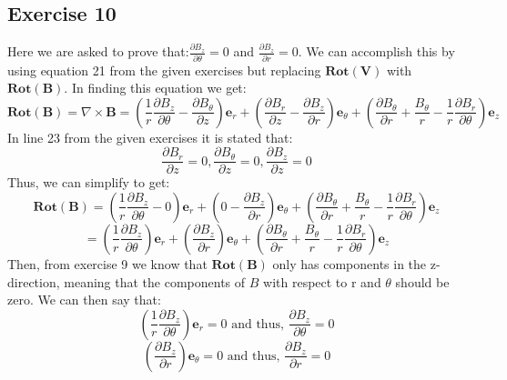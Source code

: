 \documentclass{article}
\begin{document}
\subsection{Exercise 10}
Here we are asked to prove that:$\frac{\partial B_{z}}{\partial \theta}=0$ and $\frac{\partial B_{z}}{\partial r}=0$. We can accomplish this by using equation 21 from the given exercises but replacing $\mathbf{Rot(V)}$ with $\mathbf{Rot(B)}$. In finding this equation we get:
\begin{equation}
    \mathbf{Rot(B)}=\nabla \times \mathbf{B}=\left(\frac{1}{r}\frac{\partial B_{z}}{\partial \theta}-\frac{\partial B_{\theta}}{\partial z}\right)\mathbf{e}_{r}+\left(\frac{\partial B_{r}}{\partial z}-\frac{\partial B_{z}}{\partial r}\right)\mathbf{e}_{\theta}+\left(\frac{\partial B_{\theta}}{\partial r}+\frac{B_{\theta}}{r}-\frac{1}{r}\frac{\partial B_{r}}{\partial \theta}\right)\mathbf{e}_{z}
\end{equation}
In line 23 from the given exercises it is stated that:
\begin{equation}
    \frac{\partial B_{r}}{\partial z}=0,\frac{\partial B_{\theta}}{\partial z}=0,\frac{\partial B_{z}}{\partial z}=0
\end{equation}
Thus, we can simplify to get:
\begin{equation}
    \mathbf{Rot(B)}=\left(\frac{1}{r}\frac{\partial B_{z}}{\partial \theta}-0\right)\mathbf{e}_{r}+\left(0-\frac{\partial B_{z}}{\partial r}\right)\mathbf{e}_{\theta}+\left(\frac{\partial B_{\theta}}{\partial r}+\frac{B_{\theta}}{r}-\frac{1}{r}\frac{\partial B_{r}}{\partial \theta}\right)\mathbf{e}_{z}
\end{equation}
\begin{equation}
      =\left(\frac{1}{r}\frac{\partial B_{z}}{\partial \theta}\right)\mathbf{e}_{r}+\left(\frac{\partial B_{z}}{\partial r}\right)\mathbf{e}_{\theta}+\left(\frac{\partial B_{\theta}}{\partial r}+\frac{B_{\theta}}{r}-\frac{1}{r}\frac{\partial B_{r}}{\partial \theta}\right)\mathbf{e}_{z}
\end{equation}
Then, from exercise 9 we know that $\mathbf{Rot(B)}$ only has components in the z-direction, meaning that the components of $B$ with respect to r and $\theta$ should be zero.
We can then say that:
\begin{equation} \label{eq:70}
    \left(\frac{1}{r}\frac{\partial B_{z}}{\partial \theta}\right)\mathbf{e}_{r}=0 \textrm{ and thus, } \frac{\partial B_{z}}{\partial \theta}=0
\end{equation}
\begin{equation} \label{eq:71}
    \left(\frac{\partial B_{z}}{\partial r}\right)\mathbf{e}_{\theta}=0 \textrm{ and thus, } \frac{\partial B_{z}}{\partial r}=0
\end{equation}
\end{document}
